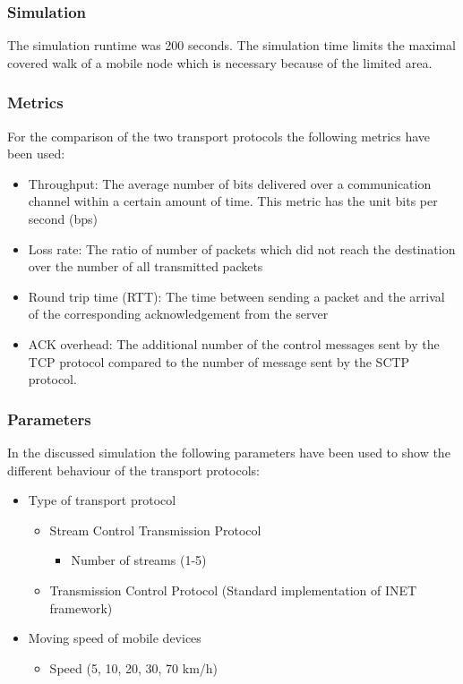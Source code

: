 \documentclass[a4paper]{article}
\begin{document}
\subsubsection{Simulation}
The simulation runtime was 200 seconds. The simulation time limits the maximal covered walk of a mobile node which is necessary because of the limited area.
\subsubsection{Metrics}
For the comparison of the two transport protocols the following metrics have been used:
\begin{itemize}
	\item Throughput: The average number of bits delivered over a communication channel within a certain amount of time. This metric has the unit bits per second (bps)
	\item Loss rate: The ratio of number of packets which did not reach the destination over the number of all transmitted packets
	\item Round trip time (RTT): The time between sending a packet and the arrival of the corresponding acknowledgement from the server
	\item ACK overhead: The additional number of the control messages sent by the TCP protocol compared to the number of message sent by the SCTP protocol.
\end{itemize}			
\subsubsection{Parameters}
In the discussed simulation the following parameters have been used to show the different behaviour of the transport protocols:
\begin{itemize}
	\item Type of transport protocol
	\begin{itemize}
		\item Stream Control Transmission Protocol
		\begin{itemize}
			\item Number of streams (1-5)
		\end{itemize}
    	\item Transmission Control Protocol (Standard implementation of INET framework)
	\end{itemize}
	\item Moving speed of mobile devices
	\begin{itemize}
		\item Speed (5, 10, 20, 30, 70 km/h)
	\end{itemize}
\end{itemize}	
\end{document}
